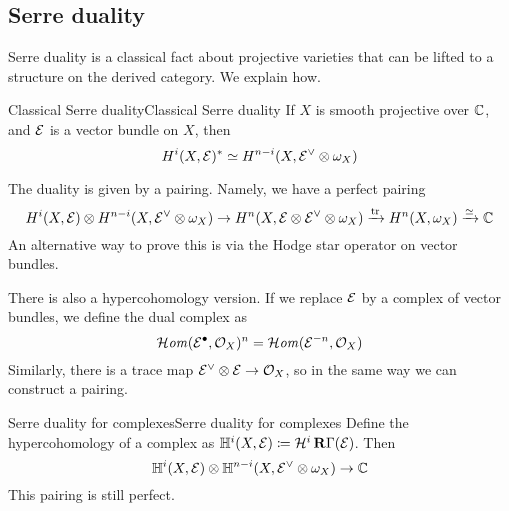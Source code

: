 \subsection{Serre duality}

Serre duality is a classical fact about projective varieties that can be lifted to a structure on the derived category. We explain how.

\begin{proposition}{Classical Serre duality}{Classical Serre duality}
    If $X$ is smooth projective over $\mathbb{C}$, and $\mathcal{E}$ is a vector bundle on $X$, then
    \begin{equation*}
        H^i(X,\mathcal{E})^* \simeq H^{n-i}(X,\mathcal{E}^\vee\otimes\omega_X)
    \end{equation*}
\end{proposition}

The duality is given by a pairing. Namely, we have a perfect pairing
\begin{equation*}
    H^i(X,\mathcal{E})\otimes H^{n-i}(X,\mathcal{E}^\vee\otimes\omega_X)
        \to H^n(X,\mathcal{E}\otimes\mathcal{E}^\vee\otimes\omega_X)
        \xrightarrow{\mathrm{tr}} H^n(X,\omega_X)
        \xrightarrow{\simeq} \mathbb{C} 
\end{equation*}
An alternative way to prove this is via the Hodge star operator on vector bundles.

There is also a hypercohomology version. If we replace $\mathcal{E}$ by a complex of vector bundles, we define the dual complex as
\begin{equation*}
    \operatorname{\mathcal{H}\mathit{om}}(\mathcal{E}^\bullet,\mathcal{O}_X)^n = \operatorname{\mathcal{H}\mathit{om}}(\mathcal{E}^{-n},\mathcal{O}_X)
\end{equation*}
Similarly, there is a trace map $\mathcal{E}^\vee\otimes\mathcal{E}\to\mathcal{O}_X$, so in the same way we can construct a pairing.


\begin{proposition}{Serre duality for complexes}{Serre duality for complexes}
    Define the hypercohomology of a complex as $\mathbb{H}^i(X,\mathcal{E})\coloneqq\mathcal{H}^i\operatorname{\mathbf{R}\Gamma}(\mathcal{E})$. Then
    \begin{equation*}
        \mathbb{H}^i(X,\mathcal{E})\otimes\mathbb{H}^{n-i}(X,\mathcal{E}^\vee\otimes\omega_X)\to\mathbb{C}
    \end{equation*}
    This pairing is still perfect.
\end{proposition}

